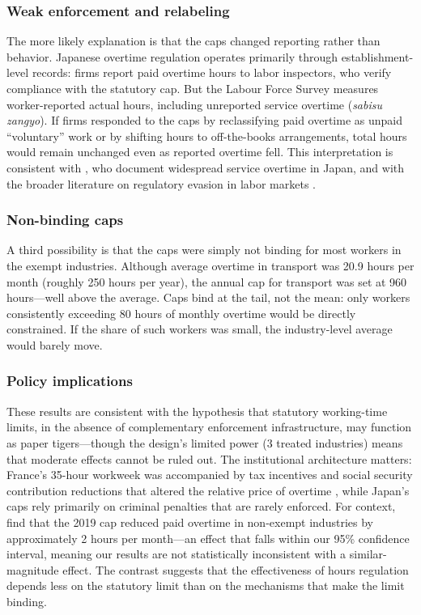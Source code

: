 \documentclass[12pt]{article}
\begin{document}
\subsubsection*{Weak enforcement and relabeling} The more likely explanation is that the caps changed reporting rather than behavior. Japanese overtime regulation operates primarily through establishment-level records: firms report paid overtime hours to labor inspectors, who verify compliance with the statutory cap. But the Labour Force Survey measures worker-reported actual hours, including unreported service overtime (\textit{sabisu zangyo}). If firms responded to the caps by reclassifying paid overtime as unpaid ``voluntary'' work or by shifting hours to off-the-books arrangements, total hours would remain unchanged even as reported overtime fell. This interpretation is consistent with \citet{kuroda2008}, who document widespread service overtime in Japan, and with the broader literature on regulatory evasion in labor markets \citep{ashenfelter2009}.

\subsubsection*{Non-binding caps} A third possibility is that the caps were simply not binding for most workers in the exempt industries. Although average overtime in transport was 20.9 hours per month (roughly 250 hours per year), the annual cap for transport was set at 960 hours---well above the average. Caps bind at the tail, not the mean: only workers consistently exceeding 80 hours of monthly overtime would be directly constrained. If the share of such workers was small, the industry-level average would barely move.

\subsubsection*{Policy implications} These results are consistent with the hypothesis that statutory working-time limits, in the absence of complementary enforcement infrastructure, may function as paper tigers---though the design's limited power (3 treated industries) means that moderate effects cannot be ruled out. The institutional architecture matters: France's 35-hour workweek was accompanied by tax incentives and social security contribution reductions that altered the relative price of overtime \citep{kramarz2010}, while Japan's caps rely primarily on criminal penalties that are rarely enforced. For context, \citet{burdin2024} find that the 2019 cap reduced paid overtime in non-exempt industries by approximately 2 hours per month---an effect that falls within our 95\% confidence interval, meaning our results are not statistically inconsistent with a similar-magnitude effect. The contrast suggests that the effectiveness of hours regulation depends less on the statutory limit than on the mechanisms that make the limit binding.
\end{document}
